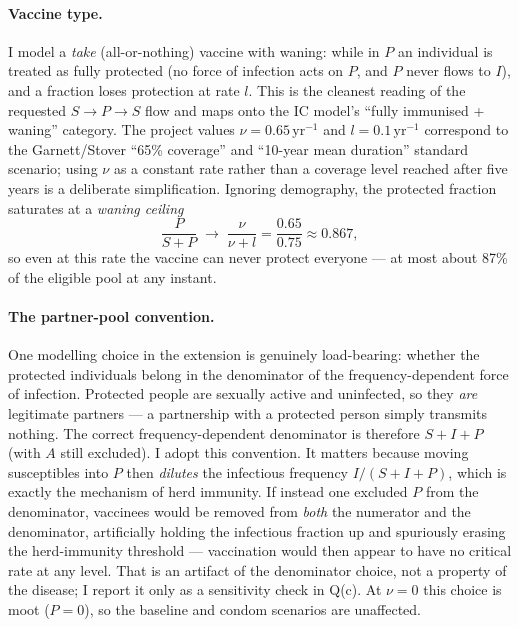 \paragraph{Vaccine type.}
I model a \emph{take} (all-or-nothing) vaccine with waning: while in $P$ an
individual is treated as fully protected (no force of infection acts on $P$, and
$P$ never flows to $I$), and a fraction loses protection at rate $l$. This is the
cleanest reading of the requested $S\to P\to S$ flow and maps onto the IC model's
``fully immunised + waning'' category. The project values $\nu=0.65\,\text{yr}^{-1}$
and $l=0.1\,\text{yr}^{-1}$ correspond to the Garnett/Stover ``65\% coverage'' and
``10-year mean duration'' standard scenario; using $\nu$ as a constant rate rather
than a coverage level reached after five years is a deliberate simplification.
Ignoring demography, the protected fraction saturates at a \emph{waning ceiling}
\begin{equation}
\frac{P}{S+P} \;\to\; \frac{\nu}{\nu+l} = \frac{0.65}{0.75} \approx 0.867,
\end{equation}
so even at this rate the vaccine can never protect everyone --- at most about 87\%
of the eligible pool at any instant.

\paragraph{The partner-pool convention.}
One modelling choice in the extension is genuinely load-bearing: whether the
protected individuals belong in the denominator of the frequency-dependent force of
infection. Protected people are sexually active and uninfected, so they \emph{are}
legitimate partners --- a partnership with a protected person simply transmits
nothing. The correct frequency-dependent denominator is therefore
$S+I+P$ (with $A$ still excluded). I adopt this convention. It matters because
moving susceptibles into $P$ then \emph{dilutes} the infectious frequency
$I/(S+I+P)$, which is exactly the mechanism of herd immunity. If instead one
excluded $P$ from the denominator, vaccinees would be removed from \emph{both} the
numerator and the denominator, artificially holding the infectious fraction up and
spuriously erasing the herd-immunity threshold --- vaccination would then appear to
have no critical rate at any level. That is an artifact of the denominator choice,
not a property of the disease; I report it only as a sensitivity check in Q(c). At
$\nu=0$ this choice is moot ($P=0$), so the baseline and condom scenarios are
unaffected.

